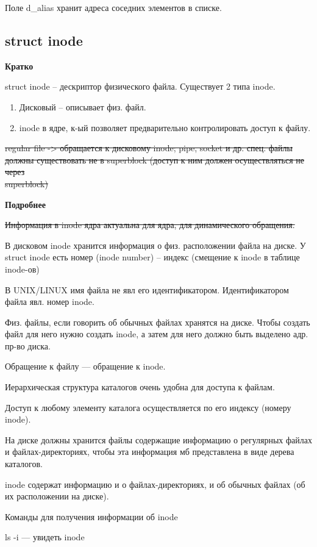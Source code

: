 Поле d\_alias хранит адреса соседних элементов в списке.

\subsection{struct inode}

\textbf{Кратко}

struct inode -- дескриптор физического файла. Существует 2 типа inode.
\begin{enumerate}
    \item Дисковый -- описывает физ. файл.
    \item inode в ядре, к-ый позволяет предварительно контролировать доступ к файлу.
\end{enumerate}

\sout{regular file -> обращается к дисковому inode; pipe, socket и др. спец. файлы должны существовать не в superblock (доступ к ним должен осуществляться не через \\ superblock)}

\textbf{Подробнее}

\sout{Информация в inode ядра актуальна для ядра, для динамического обращения.}

В дисковом inode хранится информация о физ. расположении файла на диске. У struct inode есть номер (inode number) -- индекс (смещение к inode в таблице inode-ов)

В UNIX/LINUX имя файла не явл его идентификатором. Идентификатором файла явл. номер inode.

Физ. файлы, если говорить об обычных файлах хранятся на диске. Чтобы создать файл для него нужно создать inode, а затем для него должно быть выделено адр. пр-во диска.

Обращение к файлу --- обращение к inode.

Иерархическая структура каталогов очень удобна для доступа к файлам.

Доступ к любому элементу каталога осуществляется по его индексу (номеру inode).

На диске должны хранится файлы содержащие информацию о регулярных файлах и файлах-директориях, чтобы  эта информация мб представлена в виде дерева каталогов.

inode содержат информацию и о файлах-директориях, и об обычных файлах (об их расположении на диске).

Команды для получения информации об inode

ls -i --- увидеть inode

